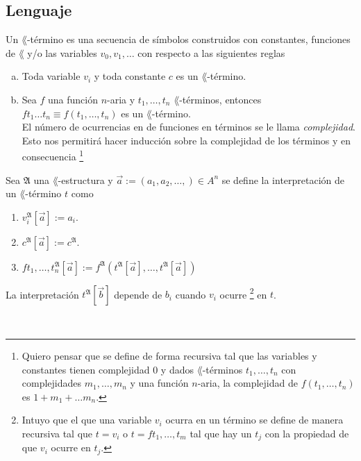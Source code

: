 \subsection{Lenguaje}
\begin{definition}
  Un $\lang$-t\'ermino es una secuencia de s\'imbolos construidos con constantes, funciones de $\lang$ y/o las variables $v_0, v_1, \dots$ con respecto a las siguientes reglas
  \begin{enumerate}[(a)]
  \item 
    Toda variable $v_i$ y toda constante $c$ es un $\lang$-t\'ermino.
  \item
    Sea $f$ una funci\'on $n$-aria y $t_1, \dots, t_n$ $\lang$-t\'erminos, entonces $f t_1 \dots t_n \equiv f (t_1, \dots, t_n)$ es un $\lang$-t\'ermino.\\
    El n\'umero de ocurrencias en de funciones en t\'erminos se le llama \emph{complejidad}.
    Esto nos permitir\'a hacer inducci\'on sobre la complejidad de los t\'erminos y en consecuencia 
    \footnote{Quiero pensar que se define de forma recursiva tal que las variables y constantes tienen complejidad $0$ y dados $\lang$-t\'erminos $t_1, \dots, t_n$ con complejidades $m_1, \dots, m_n$ y una funci\'on $n$-aria, la complejidad de $f(t_1, \dots, t_n)$ es $1 + m_1 + \dots m_n$.}
  \end{enumerate}
\end{definition}
\begin{definition}
  Sea $\mathfrak{A}$ una $\lang$-estructura y $\vec{a} := (a_1, a_2, \dots,) \in A^n$ se define la interpretaci\'on de un $\lang$-t\'ermino $t$ como
  \begin{enumerate}
  \item 
    $v_i^{\mathfrak{A}} \left[\vec{a} \right] := a_i$.
  \item
    $c^{\mathfrak{A}} \left[ \vec{a} \right] := c^{\mathfrak{A}}$.
  \item
    $ft_1, \dots, t_n^{\mathfrak{A}} \left[ \vec{a} \right] := f^{\mathfrak{A}} (t^{\mathfrak{A}} \left[\vec{a}\right], \dots, t^{\mathfrak{A}} \left[ \vec{a} \right])$
  \end{enumerate}
\end{definition}
\begin{lemma}
  La interpretaci\'on $t^{\mathfrak{A}} [\vec{b}]$ depende de $b_i$ cuando $v_i$ ocurre
  \footnote{Intuyo que el que una variable $v_i$ ocurra en un t\'ermino se define de manera recursiva tal que $t = v_i$ o $t = f t_1, \dots, t_m$ tal que hay un $t_j$ con la propiedad de que $v_i$ ocurre en $t_j$.}
  en $t$.
\end{lemma}\\
